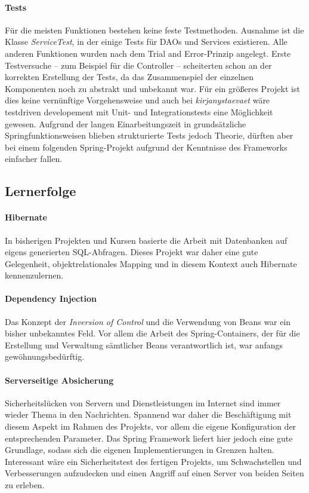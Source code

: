		\paragraph{Tests} Für die meisten Funktionen bestehen keine feste Testmethoden. Ausnahme ist die Klasse \textit{ServiceTest}, in der einige Tests für DAOs und Services existieren. Alle anderen Funktionen wurden nach dem Trial and Error-Prinzip angelegt. Erste Testversuche -- zum Beispiel für die Controller -- scheiterten schon an der korrekten Erstellung der Tests, da das Zusammenspiel der einzelnen Komponenten noch zu abstrakt und unbekannt war. Für ein größeres Projekt ist dies keine vernünftige Vorgehensweise und auch bei \textit{kirjanystaevaet} wäre testdriven developement mit Unit- und Integrationstests eine Möglichkeit gewesen. Aufgrund der langen Einarbeitungszeit in grundsätzliche Springfunktionsweisen blieben strukturierte Tests jedoch Theorie, dürften aber bei einem folgenden Spring-Projekt aufgrund der Kenntnisse des Frameworks einfacher fallen.

	\subsection{Lernerfolge}
		\paragraph{Hibernate} In bisherigen Projekten und Kursen basierte die Arbeit mit Datenbanken auf eigens generierten SQL-Abfragen. Dieses Projekt war daher eine gute Gelegenheit, objektrelationales Mapping und in diesem Kontext auch Hibernate kennenzulernen.
		
		\paragraph{Dependency Injection} Das Konzept der \textit{Inversion of Control} und die Verwendung von Beans war ein bisher unbekanntes Feld. Vor allem die Arbeit des Spring-Containers, der für die Erstellung und Verwaltung sämtlicher Beans verantwortlich ist, war anfangs ge\-wöhnungs\-be\-dürftig.
		
		\paragraph{Serverseitige Absicherung}
		Sicherheitslücken von Servern und Dienstleistungen im Internet sind immer wieder Thema in den Nachrichten. Spannend war daher die Beschäftigung mit diesem Aspekt im Rahmen des Projekts, vor allem die eigene Konfiguration der entsprechenden Parameter. Das Spring Framework liefert hier jedoch eine gute Grundlage, sodass sich die eigenen Implementierungen in Grenzen halten. Interessant wäre ein Sicherheitstest des fertigen Projekts, um Schwachstellen und Verbesserungen aufzudecken und einen Angriff auf einen Server von beiden Seiten zu erleben.
		
